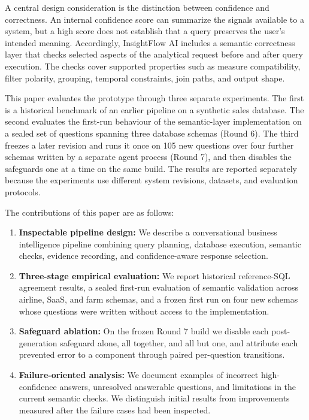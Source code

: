 \documentclass[conference]{IEEEtran}
\begin{document}
A central design consideration is the distinction between confidence and correctness. An internal confidence score can summarize the signals available to a system, but a high score does not establish that a query preserves the user's intended meaning. Accordingly, InsightFlow AI includes a semantic correctness layer that checks selected aspects of the analytical request before and after query execution. The checks cover supported properties such as measure compatibility, filter polarity, grouping, temporal constraints, join paths, and output shape.

This paper evaluates the prototype through three separate experiments. The first is a historical benchmark of an earlier pipeline on a synthetic sales database. The second evaluates the first-run behaviour of the semantic-layer implementation on a sealed set of questions spanning three database schemas (Round 6). The third freezes a later revision and runs it once on 105 new questions over four further schemas written by a separate agent process (Round 7), and then disables the safeguards one at a time on the same build. The results are reported separately because the experiments use different system revisions, datasets, and evaluation protocols.

The contributions of this paper are as follows:

\begin{enumerate}
\def\labelenumi{\arabic{enumi}.}
\item
  \textbf{Inspectable pipeline design:} We describe a conversational business intelligence pipeline combining query planning, database execution, semantic checks, evidence recording, and confidence-aware response selection.
\item
  \textbf{Three-stage empirical evaluation:} We report historical reference-SQL agreement results, a sealed first-run evaluation of semantic validation across airline, SaaS, and farm schemas, and a frozen first run on four new schemas whose questions were written without access to the implementation.
\item
  \textbf{Safeguard ablation:} On the frozen Round 7 build we disable each post-generation safeguard alone, all together, and all but one, and attribute each prevented error to a component through paired per-question transitions.
\item
  \textbf{Failure-oriented analysis:} We document examples of incorrect high-confidence answers, unresolved answerable questions, and limitations in the current semantic checks. We distinguish initial results from improvements measured after the failure cases had been inspected.
\end{enumerate}
\end{document}
